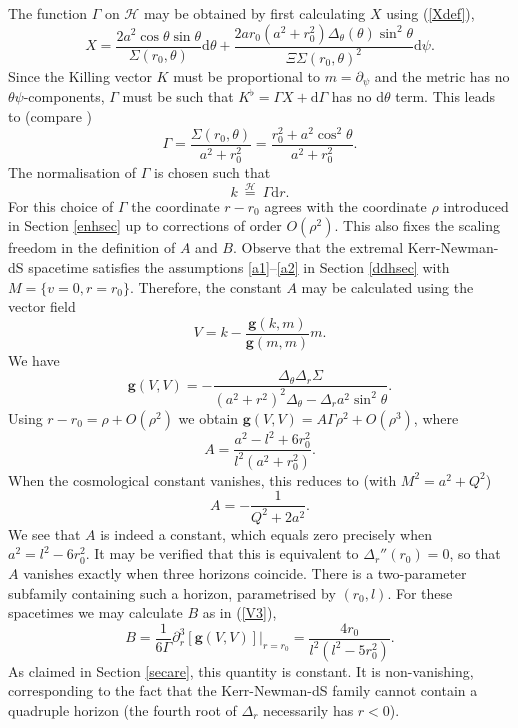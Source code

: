 \documentclass[11pt, reqno]{amsart}
\theoremstyle{plain}
\theoremstyle{definition}
\numberwithin{equation}{section}
\begin{document}
The function $\Gamma$ on $\mathcal{H}$ may be obtained by first calculating $X$ using (\ref{Xdef}),
\begin{equation}
    X = \frac{2a^2\cos \theta\sin\theta}{\Sigma(r_0,\theta)}\text{d}\theta + \frac{2ar_0(a^2 + r_0^2)\Delta_\theta(\theta)\sin^2\theta}{\Xi\Sigma(r_0,\theta)^2}\text{d}\psi.
\end{equation}
Since the Killing vector $K$ must be proportional to $m = \partial_\psi$ and the metric has no $\theta\psi$-components, $\Gamma$ must be such that $K^\flat = \Gamma X + \text{d}\Gamma$ has no d$\theta$ term. This leads to (compare \cite[Eq. 67]{KL09})
\begin{equation}
    \Gamma  = \frac{\Sigma(r_0,\theta)}{a^2 + r_0^2}= \frac{r_0^2 + a^2\cos^2\theta}{a^2 + r_0^2}.
\end{equation}
The normalisation of $\Gamma$ is chosen such that
\begin{equation} \label{normgam}
    k \:\overset{\mathcal{H}}{=}\:\Gamma \text{d}r.
\end{equation}
For this choice of $\Gamma$ the coordinate $r - r_0$ agrees with the coordinate $\rho$ introduced in Section \ref{enhsec} up to corrections of order $O(\rho^2)$. This also fixes the scaling freedom in the definition of $A$ and $B$. Observe that the extremal Kerr-Newman-dS spacetime satisfies the assumptions \eqref{a1}--\eqref{a2} in Section \ref{ddhsec} with $M = \{v=0,r=r_0\}$. Therefore, the constant $A$ may be calculated using the vector field
\begin{equation}
    V = k - \frac{\textbf{g}(k,m)}{\textbf{g}(m,m)}m.
\end{equation}
We have
\begin{equation}
    \textbf{g}(V,V) = -\frac{\Delta_\theta\Delta_r\Sigma}{(a^2 + r^2)^2\Delta_\theta-\Delta_ra^2\sin^2 \theta}.
\end{equation}
Using $r - r_0 = \rho + O(\rho^2)$ we obtain $\textbf{g}(V,V) = A\Gamma\rho^2 + O(\rho^3)$, where
\begin{equation}
    A = \frac{a^2 -l^2 + 6r_0^2}{l^2(a^2 + r_0^2)}.
\end{equation}
When the cosmological constant vanishes, this reduces to (with $M^2 = a^2 + Q^2$)
\begin{equation}
    A = -\frac{1}{Q^2 + 2a^2}.
\end{equation}
We see that $A$ is indeed a constant, which equals zero precisely when $a^2 = l^2 - 6r_0^2$. It may be verified that this is equivalent to $\Delta_r'' (r_0) = 0$, so that $A$ vanishes exactly when three horizons coincide. There is a two-parameter subfamily containing such a horizon, parametrised by $(r_0,l)$. For these spacetimes we may calculate $B$ as in (\ref{V3}),
\begin{equation}
B =  \frac{1}{6\Gamma}\partial_r^3\left[\textbf{g}(V,V)\right]\vert_{r = r_0} = \frac{4r_0}{l^2(l^2-5r_0^2)}.
\end{equation}
As claimed in Section \ref{secare}, this quantity is constant. It is non-vanishing, corresponding to the fact that the Kerr-Newman-dS family cannot contain a quadruple horizon (the fourth root of $\Delta_r$ necessarily has $r < 0$).
\end{document}

